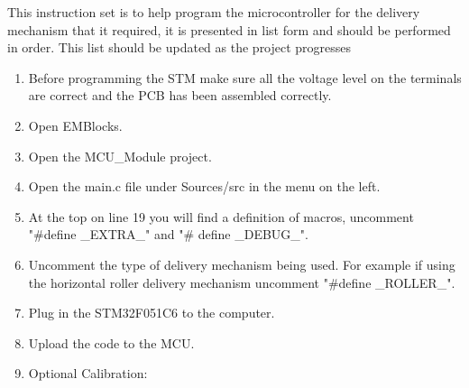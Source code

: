 \documentclass[a4paper,11pt]{article}
\numberwithin{figure}{section}
\numberwithin{table}{section}
\begin{document}
\begin{appendices}
This instruction set is to help program the microcontroller for the delivery mechanism that it required, it is presented in list form and should be performed in order. This list should be updated as the project progresses
\begin{enumerate}
  \item Before programming the STM make sure all the voltage level on the terminals are correct and the PCB has been assembled correctly.
  \item Open EMBlocks.
  \item Open the MCU\_Module project.
  \item Open the main.c file under Sources/src in the menu on the left.
  \item At the top on line 19 you will find a definition of macros, uncomment "\#define \_EXTRA\_" and "\# define \_DEBUG\_".
  \item Uncomment the type of delivery mechanism being used. For example if using the horizontal roller delivery mechanism uncomment "\#define \_ROLLER\_".
  \item Plug in the STM32F051C6 to the computer.
  \item Upload the code to the MCU.
  \item Optional Calibration: {
  \begin{enumerate}
 

\end{enumerate}}
\end{enumerate}
\end{appendices}
\end{document}
